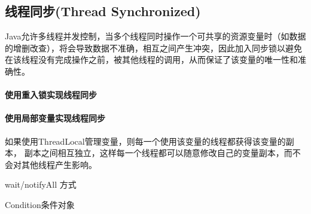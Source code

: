 \documentclass[../../../interview-questions.tex]{subfiles}
\begin{document}
\subsection{线程同步(Thread Synchronized)}

Java允许多线程并发控制，当多个线程同时操作一个可共享的资源变量时（如数据的增删改查），将会导致数据不准确，相互之间产生冲突，因此加入同步锁以避免在该线程没有完成操作之前，被其他线程的调用，从而保证了该变量的唯一性和准确性。

\paragraph{使用重入锁实现线程同步}

\paragraph{使用局部变量实现线程同步}

如果使用ThreadLocal管理变量，则每一个使用该变量的线程都获得该变量的副本，
副本之间相互独立，这样每一个线程都可以随意修改自己的变量副本，而不会对其他线程产生影响。

wait/notifyAll 方式

Condition条件对象
\end{document}
